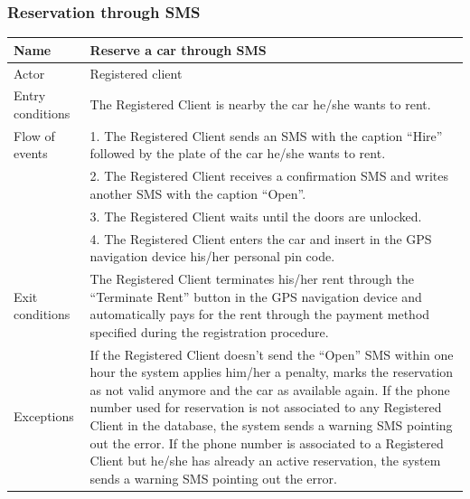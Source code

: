 \subsubsection{Reservation through SMS}
\begin{table}[!h]
\begin{tabularx}{\linewidth}{l|X}
\centering
Name & Reserve a car through SMS \\ \hline
Actor & Registered client \\ \hline
Entry conditions & The Registered Client is nearby the car he/she wants to rent. \\ \hline
Flow of events & 1. The Registered Client sends an SMS with the caption “Hire” followed by the plate of the car he/she wants to rent. \\
& 2. The Registered Client receives a confirmation SMS and writes another SMS with the caption “Open”.\\
& 3. The Registered Client waits until the doors are unlocked. \\
& 4. The Registered Client enters the car and insert in the GPS navigation device his/her personal pin code. \\ \hline
Exit conditions & The Registered Client terminates his/her rent through the “Terminate Rent” button in the GPS navigation device and automatically pays for the rent through the payment method specified during the registration procedure. \\ \hline
Exceptions & If the Registered Client doesn’t send the “Open” SMS within one hour  the system applies him/her a penalty, marks the reservation as not valid anymore and the car as available again. If the phone number used for reservation is not associated to any Registered Client in the database, the system sends a warning SMS pointing out the error. If the phone number is associated to a Registered Client but he/she has already an active reservation, the system sends a warning SMS pointing out the error. \\
\end{tabularx}
\end{table}

\clearpage
